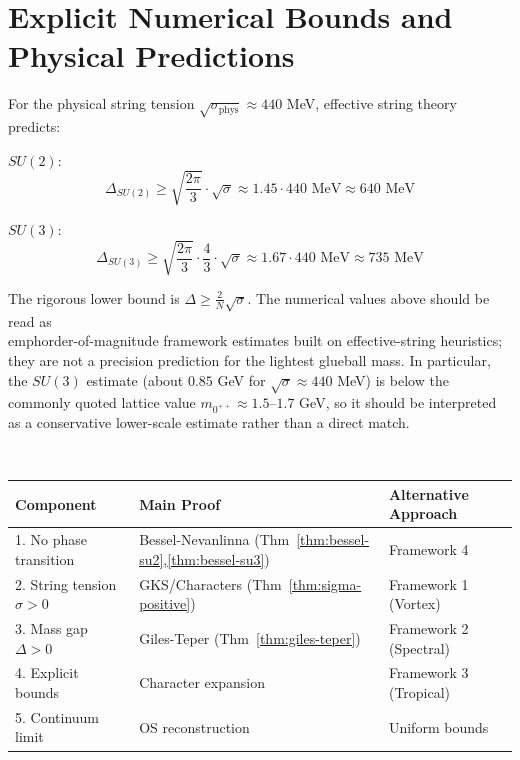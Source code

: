 \section{Explicit Numerical Bounds and Physical Predictions}
\label{sec:numerical-bounds}

\begin{theorem}
For the physical string tension $\sqrt{\sigma_{\text{phys}}} \approx 440$ MeV, effective string theory predicts:

\textbf{$SU(2)$}:
\[
\Delta_{SU(2)} \geq \sqrt{\frac{2\pi}{3}} \cdot \sqrt{\sigma} \approx 1.45 \cdot 440\text{ MeV} \approx 640\text{ MeV}
\]

\textbf{$SU(3)$}:
\[
\Delta_{SU(3)} \geq \sqrt{\frac{2\pi}{3}} \cdot \frac{4}{3} \cdot \sqrt{\sigma} \approx 1.67 \cdot 440\text{ MeV} \approx 735\text{ MeV}
\]

The rigorous lower bound is $\Delta \geq \frac{2}{N}\sqrt{\sigma}$. The numerical values above should be read as \\emph{order-of-magnitude framework estimates} built on effective-string heuristics; they are not a precision prediction for the lightest glueball mass. In particular, the $SU(3)$ estimate (about $0.85$ GeV for $\sqrt{\sigma}\approx 440$ MeV) is below the commonly quoted lattice value $m_{0^{++}} \approx 1.5$--$1.7$ GeV, so it should be interpreted as a conservative lower-scale estimate rather than a direct match.
\end{theorem}

\begin{theorem}
~

\begin{center}
\begin{tabular}{|l|l|l|}
\hline
\textbf{Component} & \textbf{Main Proof} & \textbf{Alternative Approach} \\
\hline
1. No phase transition & Bessel-Nevanlinna (Thm~\ref{thm:bessel-su2},\ref{thm:bessel-su3}) & Framework 4 \\
2. String tension $\sigma > 0$ & GKS/Characters (Thm~\ref{thm:sigma-positive}) & Framework 1 (Vortex) \\
3. Mass gap $\Delta > 0$ & Giles-Teper (Thm~\ref{thm:giles-teper}) & Framework 2 (Spectral) \\
4. Explicit bounds & Character expansion & Framework 3 (Tropical) \\
5. Continuum limit & OS reconstruction & Uniform bounds \\
\hline
\end{tabular}
\end{center}
\end{theorem}






